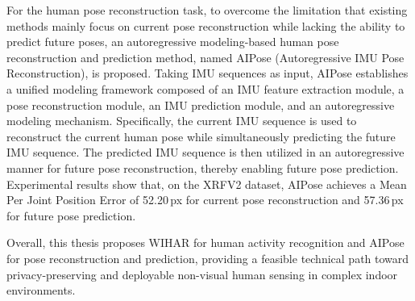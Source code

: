\begin{englishabstract}
For the human pose reconstruction task, to overcome the limitation that existing methods mainly focus on current pose reconstruction while lacking the ability to predict future poses, an autoregressive modeling-based human pose reconstruction and prediction method, named AIPose (Autoregressive IMU Pose Reconstruction), is proposed. Taking IMU sequences as input, AIPose establishes a unified modeling framework composed of an IMU feature extraction module, a pose reconstruction module, an IMU prediction module, and an autoregressive modeling mechanism. Specifically, the current IMU sequence is used to reconstruct the current human pose while simultaneously predicting the future IMU sequence. The predicted IMU sequence is then utilized in an autoregressive manner for future pose reconstruction, thereby enabling future pose prediction. Experimental results show that, on the XRFV2 dataset, AIPose achieves a Mean Per Joint Position Error of 52.20\,px for current pose reconstruction and 57.36\,px for future pose prediction.

Overall, this thesis proposes WIHAR for human activity recognition and AIPose for pose reconstruction and prediction, providing a feasible technical path toward privacy-preserving and deployable non-visual human sensing in complex indoor environments.


\end{englishabstract}
